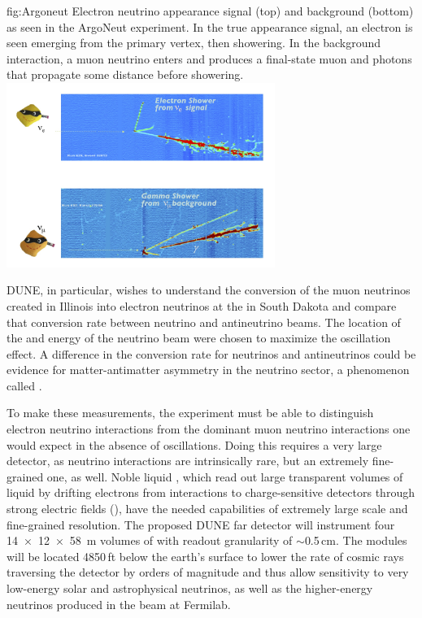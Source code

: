 \documentclass[../main-v1.tex]{subfiles}
\begin{document}
\begin{dunefigure}
{fig:Argoneut}
{Electron neutrino appearance signal (top) and background (bottom) as seen in the ArgoNeut experiment.  In the true appearance signal, an electron is seen emerging from the primary vertex, then showering.  In the background interaction, a muon neutrino enters and  produces a final-state muon and photons that propagate some distance before showering.}
\includegraphics[trim={0cm 0.6cm 2.5cm 0.7cm},clip,height=6cm]{graphics/IntroFigures/Fig_02_Argoneut.jpg} 
\end{dunefigure}


DUNE,  in particular,   wishes to understand the conversion of the muon neutrinos created in Illinois %
 into electron neutrinos at the  %
 in South Dakota  %
and compare that conversion rate between neutrino and antineutrino beams. The location of the  and energy of the neutrino beam were chosen to maximize the oscillation effect.   A difference in the conversion rate for neutrinos and antineutrinos could be evidence for matter-antimatter asymmetry in the neutrino sector, a phenomenon called .  

To make these measurements, the experiment must be able to distinguish %
electron neutrino interactions  from the dominant muon neutrino interactions one would expect in the absence of oscillations.  %
Doing this requires a very large detector, as neutrino interactions are intrinsically rare, but an extremely  fine-grained one, as well.  Noble liquid  , %
which read out large transparent volumes of liquid by drifting electrons from interactions to charge-sensitive detectors through strong electric fields (), have the needed capabilities of extremely large scale and fine-grained resolution. The proposed DUNE far detector will instrument four \SI{14x12x58}{m} %
volumes of  with readout granularity of $\sim$0.5\,cm.  The  modules will be located 4850\,ft below the earth's surface to lower the rate of cosmic rays traversing the detector by orders of magnitude and thus allow sensitivity to very low-energy solar and astrophysical neutrinos, as well as the higher-energy neutrinos produced in the beam at Fermilab.  %
\end{document}
